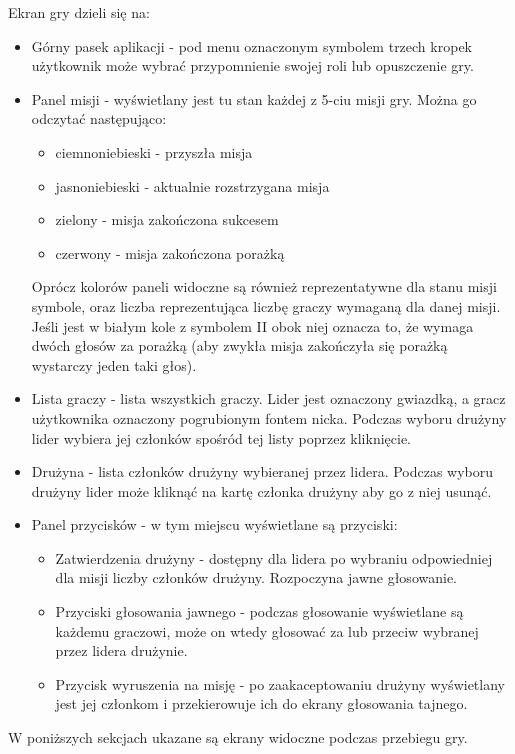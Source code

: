 \documentclass[12pt]{article}
\begin{document}
Ekran gry dzieli się na:
\begin{itemize}
    \item Górny pasek aplikacji - pod menu oznaczonym symbolem trzech kropek użytkownik może wybrać przypomnienie swojej roli lub opuszczenie gry.
    \item Panel misji - wyświetlany jest tu stan każdej z 5-ciu misji gry. Można go odczytać następująco: 
    \begin{itemize}
        \item ciemnoniebieski - przyszła misja
        \item jasnoniebieski - aktualnie rozstrzygana misja
        \item zielony - misja zakończona sukcesem
        \item czerwony - misja zakończona porażką
    \end{itemize}
    Oprócz kolorów paneli widoczne są również reprezentatywne dla stanu misji symbole, oraz liczba reprezentująca liczbę graczy wymaganą dla danej misji. Jeśli jest w białym kole z symbolem II obok niej oznacza to, że wymaga dwóch głosów za porażką (aby zwykła misja zakończyła się porażką wystarczy jeden taki głos).
    \item Lista graczy - lista wszystkich graczy. Lider jest oznaczony gwiazdką, a gracz użytkownika oznaczony pogrubionym fontem nicka. Podczas wyboru drużyny lider wybiera jej członków spośród tej listy poprzez kliknięcie.
    \item Drużyna - lista członków drużyny wybieranej przez lidera. Podczas wyboru drużyny lider może kliknąć na kartę członka drużyny aby go z niej usunąć.
    \item Panel przycisków - w tym miejscu wyświetlane są przyciski:
    \begin{itemize}
        \item Zatwierdzenia drużyny - dostępny dla lidera po wybraniu odpowiedniej dla misji liczby członków drużyny. Rozpoczyna jawne głosowanie.
        \item Przyciski głosowania jawnego - podczas głosowanie wyświetlane są każdemu graczowi, może on wtedy głosować za lub przeciw wybranej przez lidera drużynie.
        \item Przycisk wyruszenia na misję - po zaakaceptowaniu drużyny wyświetlany jest jej członkom i przekierowuje ich do ekrany głosowania tajnego.
    \end{itemize}
\end{itemize}

W poniższych sekcjach ukazane są ekrany widoczne podczas przebiegu gry.
\end{document}
